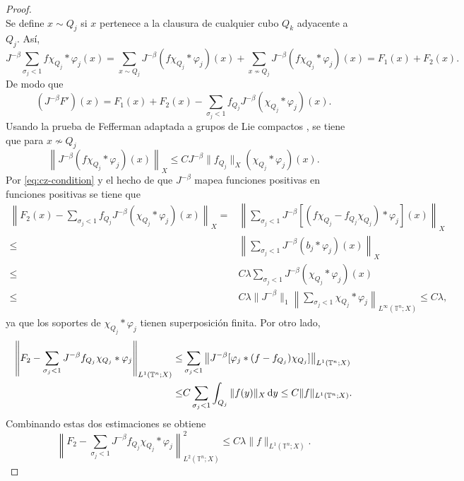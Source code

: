 \begin{proof}
\begin{equation*}
	\end{equation*}
	Se define $x \sim Q_j$ si $x$ pertenece a la clausura de cualquier cubo $Q_k$ adyacente a $Q_j$. Así,
	\begin{equation*}
		J^{-\beta}\sum_{\sigma_j < 1}f\chi_{Q_j} * \varphi_j (x) = \sum_{x\sim Q_j}J^{-\beta} (f\chi_{Q_j} * \varphi_j )(x) + \sum_{x\nsim Q_j}J^{-\beta} (f\chi_{Q_j} * \varphi_j )(x)  = F_1(x) + F_2(x).
	\end{equation*}
	De modo que
	\begin{equation*}
		(J^{-\beta} F')(x) = F_1(x) + F_2(x) - \sum_{\sigma_j < 1}f_{Q_j}J^{-\beta} (\chi_{Q_j}*\varphi_j)(x).
	\end{equation*}
	Usando la prueba de Fefferman adaptada a grupos de Lie compactos \cite{cardona-ruzhansky}, se tiene que para $x \nsim Q_j$
	\begin{equation*}
		\left\|J^{-\beta} (f\chi_{Q_j} *\varphi_j)(x)\right\|_X \leq CJ^{-\beta} \|f_{Q_j}\|_X (\chi_{Q_j}*\varphi_j)(x).
	\end{equation*}
	Por \cref{eq:cz-condition} y el hecho de que $J^{-\beta}$ mapea funciones positivas en funciones positivas se tiene que
	\begin{align*}
		\left\| F_2(x) - \sum_{\sigma_j<1} f_{Q_j}J^{-\beta}(\chi_{Q_j} * \varphi_j)(x) \right\|_X = & \left\| \sum_{\sigma_j<1} J^{-\beta}[(f\chi_{Q_j} - f_{Q_j}\chi_{Q_j}) * \varphi_j](x) \right\|_X \\
		\leq & \left\| \sum_{\sigma_j<1} J^{-\beta}(b_j * \varphi_j)(x) \right\|_X \\
		\leq & C\lambda \sum_{\sigma_j<1} J^{-\beta} (\chi_{Q_j}*\varphi_j)(x)\\
		\leq & C\lambda \|J^{-\beta}\|_1\left\| \sum_{\sigma_j <1}\chi_{Q_j} *\varphi_j \right\|_{L^\infty(\mathbb{T}^n; X)} \leq C\lambda ,
	\end{align*}
	ya que los soportes de $ \chi_{Q_j} * \varphi_j $ tienen superposición finita. Por otro lado,
	\begin{align*}
		\left\| F_2 - \sum_{\sigma_j < 1} J^{-\beta} f_{Q_j}\chi_{Q_j} * \varphi_j \right\|_{L^1(\mathbb{T}^n; X)} \leq & \sum_{\sigma_j<1} \left\|J^{-\beta}[\varphi_j * (f - f_{Q_j})\chi_{Q_j}]\right\|_{L^1(\mathbb{T}^n; X)} \\
		\leq & C\sum_{\sigma_j < 1}\int_{Q_j}\|f(y)\|_X \mathop{}\!\mathrm{d} y \leq C\|f\|_{L^1(\mathbb{T}^n; X)}.
	\end{align*}
	Combinando estas dos estimaciones se obtiene
	\begin{equation*}
		\left\| F_2 - \sum_{\sigma_j < 1} J^{-\beta} f_{Q_j}\chi_{Q_j} * \varphi_j \right\|_{L^2(\mathbb{T}^n; X)}^2 \leq C\lambda\|f\|_{L^1(\mathbb{T}^n; X)} .

\end{equation*}
\end{proof}
